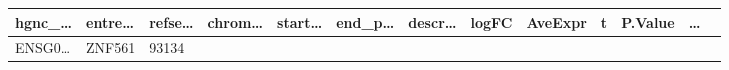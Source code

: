 \documentclass[
]{article}
\begin{document}
\begin{longtable}[]{@{}lllllllllllll@{}}
\begin{minipage}[b]{0.05\columnwidth}
hgnc\_\ldots{}\strut
\end{minipage} & \begin{minipage}[b]{0.05\columnwidth}\raggedright
entre\ldots{}\strut
\end{minipage} & \begin{minipage}[b]{0.05\columnwidth}\raggedright
refse\ldots{}\strut
\end{minipage} & \begin{minipage}[b]{0.05\columnwidth}\raggedright
chrom\ldots{}\strut
\end{minipage} & \begin{minipage}[b]{0.05\columnwidth}\raggedright
start\ldots{}\strut
\end{minipage} & \begin{minipage}[b]{0.05\columnwidth}\raggedright
end\_p\ldots{}\strut
\end{minipage} & \begin{minipage}[b]{0.05\columnwidth}\raggedright
descr\ldots{}\strut
\end{minipage} & \begin{minipage}[b]{0.05\columnwidth}\raggedright
logFC\strut
\end{minipage} & \begin{minipage}[b]{0.05\columnwidth}\raggedright
AveExpr\strut
\end{minipage} & \begin{minipage}[b]{0.05\columnwidth}\raggedright
t\strut
\end{minipage} & \begin{minipage}[b]{0.05\columnwidth}\raggedright
P.Value\strut
\end{minipage} & \begin{minipage}[b]{0.02\columnwidth}\raggedright
\ldots{}\strut
\end{minipage}\tabularnewline
\midrule
\endhead
\begin{minipage}[t]{0.05\columnwidth}\raggedright
ENSG0\ldots{}\strut
\end{minipage} & \begin{minipage}[t]{0.05\columnwidth}\raggedright
ZNF561\strut
\end{minipage} & \begin{minipage}[t]{0.05\columnwidth}\raggedright
93134\strut
\end{minipage} & \begin{minipage}[t]{0.05\columnwidth}\raggedright
\strut
\end{minipage} & \begin{minipage}[t]{0.05\columnwidth}\raggedright

\end{minipage}
\end{longtable}
\end{document}
